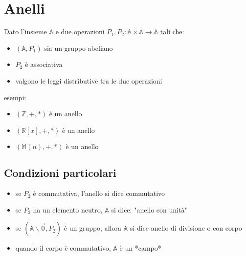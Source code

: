 \documentclass{subfiles}
\begin{document}
\section{Anelli}

Dato l'insieme $\mathbb{A}$ e due operazioni $P_1,P_2: \mathbb{A} \times \mathbb{A} \to \mathbb{A}$ tali che:

\begin{itemize}
    \item $(\mathbb{A}, P_1)$ sia un gruppo abeliano
    \item $P_2$ è associativa
    \item valgono le leggi distributive tra le due operazioni
\end{itemize}

\noindent
esempi:

\begin{itemize}
    \item $(\mathbb{Z}, +, *)$ è un anello
    \item $(\mathbb{R}[x], +, *)$ è un anello
    \item $(\mathbb{M}(n), +, *)$ è un anello
\end{itemize}

\subsection{Condizioni particolari}

\begin{itemize}
    \item se $P_2$ è commutativa, l'anello si dice commutativo
    \item se $P_2$ ha un elemento neutro, $\mathbb{A}$ si dice: "anello con unità"
    \item se $(\mathbb{A} \backslash \vec{0}, P_2)$ è un gruppo, allora $\mathbb{A}$ si dice anello di divisione o con corpo
    \item quando il corpo è commutativo, $\mathbb{A}$ è un *campo*
\end{itemize}
\end{document}

